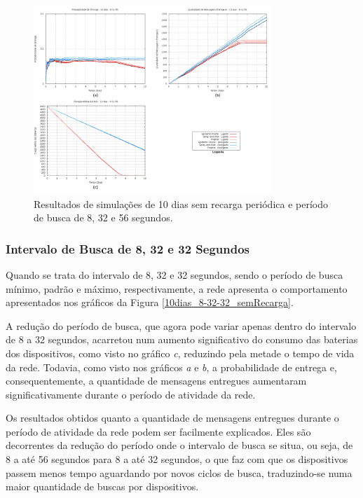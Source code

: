 \begin{figure}
\centering
\includegraphics[width=0.8\textwidth]{figuras/cap_5/graficos/8_32_56/MessageDeliveryReport_10_8-32-56_noRecharge.png}
\caption{Resultados de simulações de 10 dias sem recarga periódica e período de busca de 8, 32 e 56 segundos.}
\label{10dias_8-32-56_semRecarga}
\end{figure}

\newpage
\subsubsection{Intervalo de Busca de 8, 32 e 32 Segundos}
\label{8-32-32_semRecarga}

Quando se trata do intervalo de 8, 32 e 32 segundos, sendo o período de busca mínimo, padrão e máximo, respectivamente, a rede apresenta o comportamento apresentados nos gráficos da Figura \ref{10dias_8-32-32_semRecarga}.

A redução do período de busca, que agora pode variar apenas dentro do intervalo de 8 a 32 segundos, acarretou num aumento significativo do consumo das baterias dos dispositivos, como visto no gráfico \emph{c}, reduzindo pela metade o tempo de vida da rede. Todavia, como visto nos gráficos \emph{a} e \emph{b}, a probabilidade de entrega e, consequentemente, a quantidade de mensagens entregues aumentaram significativamente durante o período de atividade da rede.

Os resultados obtidos quanto a quantidade de mensagens entregues durante o período de atividade da rede podem ser facilmente explicados. Eles são decorrentes da redução do período onde o intervalo de busca se situa, ou seja, de 8 a até 56 segundos para 8 a até 32 segundos, o que faz com que os dispositivos passem menos tempo aguardando por novos ciclos de busca, traduzindo-se numa maior quantidade de buscas por dispositivos. 

